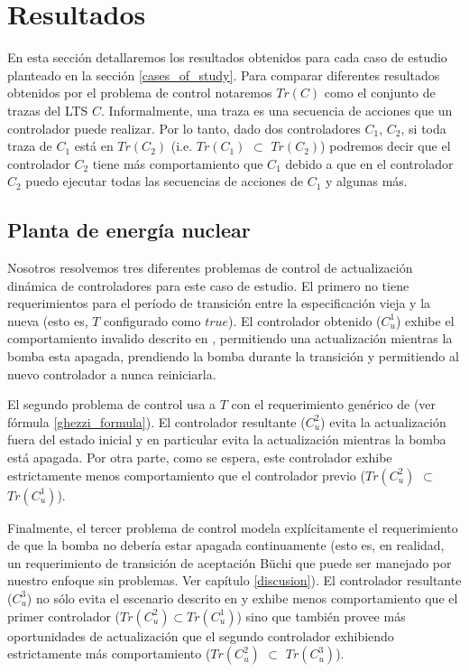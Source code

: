 \section{Resultados}

En esta sección detallaremos los resultados obtenidos para cada caso de estudio planteado en la sección
\ref{cases_of_study}. Para comparar diferentes resultados obtenidos por el problema de control notaremos $Tr(C)$ como el
conjunto de trazas del LTS $C$. Informalmente, una traza es una secuencia de acciones que un controlador puede
realizar. Por lo tanto, dado dos controladores $C_1$, $C_2$, si toda traza de $C_1$ está en $Tr(C_2)$ (i.e. $Tr(C_1)$
$\subset$ $Tr(C_2)$) podremos decir que el controlador $C_2$ tiene más comportamiento que $C_1$ debido a que en el controlador
$C_2$ puedo ejecutar todas las secuencias de acciones de $C_1$ y algunas más.

\subsection{Planta de energía nuclear}

Nosotros resolvemos tres diferentes problemas de control de actualización dinámica de controladores para este caso de
estudio. El primero no tiene requerimientos para el período de transición entre la especificación vieja y la nueva (esto
es, $T$ configurado como $true$). El controlador obtenido ($C^1_u$) exhibe el comportamiento invalido descrito en
\cite{PanzicaLaManna:2013:FCC:2487336.2487349}, permitiendo una actualización mientras la bomba esta apagada, prendiendo
la bomba durante la transición y permitiendo al nuevo controlador a nunca reiniciarla.

El segundo problema de control usa a $T$ con el requerimiento genérico de \cite{6224401} (ver fórmula
\ref{ghezzi_formula}). El controlador resultante ($C_u^{2}$) evita la actualización fuera del estado inicial y en
particular evita la actualización mientras la bomba está apagada. Por otra parte, como se espera, este controlador exhibe
estrictamente menos comportamiento que el controlador previo ($Tr(C^2_u)$ $\subset$ $Tr(C^1_u)$).

Finalmente, el tercer problema de control modela explícitamente el requerimiento de que la bomba no debería estar
apagada continuamente (esto es, en realidad, un requerimiento de transición de aceptación Büchi que puede ser manejado
por nuestro enfoque sin problemas. Ver capítulo \ref{discusion}). El controlador resultante ($C^3_u$) no sólo evita el
escenario descrito en \cite{PanzicaLaManna:2013:FCC:2487336.2487349} y exhibe menos comportamiento que el primer
controlador ($Tr(C^2_u) \subset Tr(C^1_u)$) sino que también provee más oportunidades de actualización que el segundo
controlador exhibiendo estrictamente más comportamiento ($Tr(C^2_u)$ $\subset$ $Tr(C^3_u)$). 

